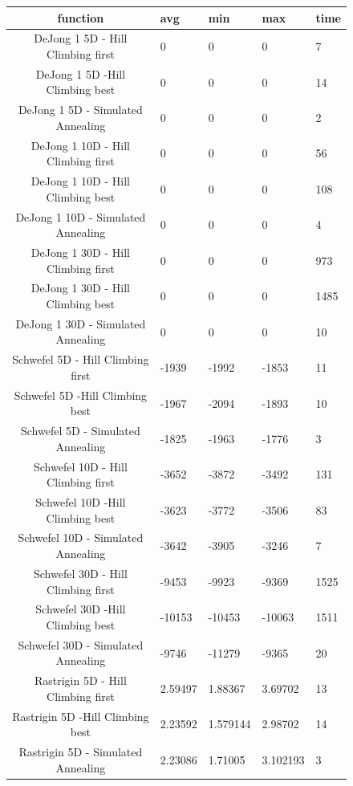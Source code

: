 \documentclass{article}
\begin{document}
\begin{figure}[!h]
\begin{tabular}{||c|||l|l||l||l||}
  \hline
  function & avg & min & max & time\\ \hline \hline
DeJong 1 5D - Hill Climbing first & 0 & 0 & 0 & 7 \\ \hline
DeJong 1 5D -Hill Climbing  best & 0 & 0 & 0 & 14 \\ \hline
DeJong 1 5D - Simulated Annealing  & 0 & 0 & 0 & 2 \\ \hline

DeJong 1 10D - Hill Climbing first & 0 & 0 & 0 & 56 \\ \hline
DeJong 1 10D - Hill Climbing best & 0 & 0 & 0 & 108 \\ \hline
DeJong 1 10D - Simulated Annealing & 0 & 0 & 0 & 4 \\ \hline

DeJong 1 30D - Hill Climbing first & 0 & 0 & 0 & 973 \\ \hline
DeJong 1 30D - Hill Climbing best & 0 & 0 & 0 & 1485 \\ \hline
DeJong 1 30D - Simulated Annealing & 0 & 0 & 0 & 10 \\ \hline

Schwefel 5D - Hill Climbing first & -1939 & -1992 & -1853 & 11 \\ \hline
Schwefel 5D -Hill Climbing  best & -1967 & -2094 & -1893 & 10 \\ \hline
Schwefel 5D - Simulated Annealing & -1825 & -1963 & -1776  & 3 \\ \hline

Schwefel 10D - Hill Climbing first & -3652 & -3872 & -3492 & 131 \\ \hline
Schwefel 10D -Hill Climbing  best & -3623 & -3772 & -3506 & 83 \\ \hline
Schwefel 10D - Simulated Annealing & -3642 & -3905 & -3246  & 7 \\ \hline

Schwefel 30D - Hill Climbing first & -9453 & -9923 & -9369 & 1525 \\ \hline
Schwefel 30D -Hill Climbing  best & -10153 & -10453 & -10063 & 1511 \\ \hline
Schwefel 30D - Simulated Annealing & -9746  & -11279 & -9365  & 20 \\ \hline

Rastrigin 5D - Hill Climbing first & 2.59497 & 1.88367 & 3.69702 & 13 \\ \hline
Rastrigin 5D -Hill Climbing  best & 2.23592 & 1.579144 & 2.98702 & 14 \\ \hline
Rastrigin 5D - Simulated Annealing & 2.23086 & 1.71005 & 3.102193 & 3 \\ \hline


\end{tabular}
\end{figure}
\end{document}
